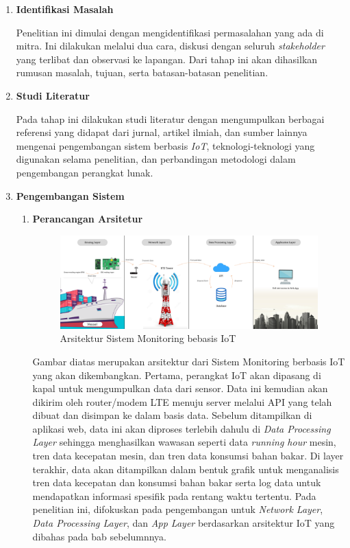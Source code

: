 \begin{enumerate}
    \item \textbf{Identifikasi Masalah}

    Penelitian ini dimulai dengan mengidentifikasi permasalahan yang ada di mitra. Ini dilakukan melalui dua cara, diskusi dengan seluruh \textit{stakeholder} yang terlibat dan observasi ke lapangan. Dari tahap ini akan dihasilkan rumusan masalah, tujuan, serta batasan-batasan penelitian.

    \item \textbf{Studi Literatur}

    Pada tahap ini dilakukan studi literatur dengan mengumpulkan berbagai referensi yang didapat dari jurnal, artikel ilmiah, dan sumber lainnya mengenai pengembangan sistem berbasis \textit{IoT}, teknologi-teknologi yang digunakan selama penelitian, dan perbandingan metodologi dalam pengembangan perangkat lunak.

    \item \textbf{Pengembangan Sistem}

    \begin{enumerate}[label*=\arabic*.]
        \item \textbf{Perancangan Arsitetur}

        \begin{figure}[!h]
            \includegraphics[width=1\linewidth, center]{images/metode/fig-system-archi.png}
            \caption{Arsitektur Sistem Monitoring bebasis IoT}
            \label{fig:system-archi}
        \end{figure}

        Gambar diatas merupakan arsitektur dari Sistem Monitoring berbasis IoT yang akan dikembangkan. Pertama, perangkat IoT akan dipasang di kapal untuk mengumpulkan data dari sensor. Data ini kemudian akan dikirim oleh router/modem LTE menuju server melalui API yang telah dibuat dan disimpan ke dalam basis data. Sebelum ditampilkan di aplikasi web, data ini akan diproses terlebih dahulu di \textit{Data Processing Layer} sehingga menghasilkan wawasan seperti data \textit{running hour} mesin, tren data kecepatan mesin, dan tren data konsumsi bahan bakar. Di layer terakhir, data akan ditampilkan dalam bentuk grafik untuk menganalisis tren data kecepatan dan konsumsi bahan bakar serta log data untuk mendapatkan informasi spesifik pada rentang waktu tertentu. Pada penelitian ini, difokuskan pada pengembangan untuk \textit{Network Layer}, \textit{Data Processing Layer}, dan \textit{App Layer} berdasarkan arsitektur IoT yang dibahas pada bab sebelumnnya.


\end{enumerate}
\end{enumerate}
